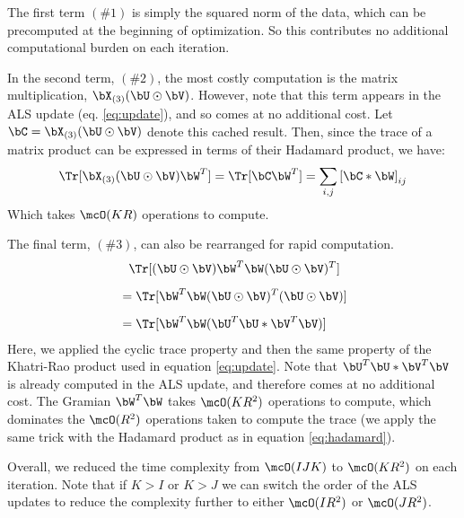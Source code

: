 \documentclass{article}
\begin{document}
The first term $(\#1)$ is simply the squared norm of the data, which can be precomputed at the beginning of optimization. So this contributes no additional computational burden on each iteration.

In the second term, $(\#2)$, the most costly computation is the matrix multiplication, $\bX_{(3)} (\bU \odot \bV)$.
However, note that this term appears in the ALS update (eq. \ref{eq:update}), and so comes at no additional cost.
Let $\bC = \bX_{(3)} (\bU \odot \bV)$ denote this cached result.
Then, since the trace of a matrix product can be expressed in terms of their Hadamard product, we have:
\begin{equation}
\label{eq:hadamard}
\Tr [ \bX_{(3)} (\bU \odot \bV) \bW^T] = \Tr [ \bC \bW^T] = \sum_{i,j} \left [ \bC * \bW \right ]_{ij}
\end{equation}
Which takes $\mcO(KR)$ operations to compute.

The final term, $(\#3)$, can also be rearranged for rapid computation.
\begin{align*}
&\phantom{=} \Tr [ (\bU \odot \bV) \bW^T \bW (\bU \odot \bV)^T ] \\[.5em]
&= \Tr [ \bW^T \bW (\bU \odot \bV)^T (\bU \odot \bV)] \\[.5em]
&= \Tr [ \bW^T \bW (\bU^T \bU * \bV^T \bV)]
\end{align*}
Here, we applied the cyclic trace property and then the same property of the Khatri-Rao product used in equation \ref{eq:update}.
Note that $\bU^T \bU * \bV^T \bV$ is already computed in the ALS update, and therefore comes at no additional cost.
The Gramian $\bW^T \bW$ takes $\mcO(KR^2)$ operations to compute, which dominates the $\mcO(R^2)$ operations taken to compute the trace (we apply the same trick with the Hadamard product as in equation \ref{eq:hadamard}).

Overall, we reduced the time complexity from $\mcO(IJK)$ to $\mcO(KR^2)$ on each iteration.
Note that if $K > I$ or $K > J$ we can switch the order of the ALS updates to reduce the complexity further to either $\mcO(IR^2)$ or $\mcO(JR^2)$.
\end{document}
